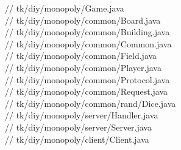\documentclass[12pt,titlepage,oneside]{article}
\newcommand{\includesrc}[1]{{// #1}\\}
\begin{document}
        \includesrc{tk/diy/monopoly/Game.java}
        \includesrc{tk/diy/monopoly/common/Board.java}
        \includesrc{tk/diy/monopoly/common/Building.java}
        \includesrc{tk/diy/monopoly/common/Common.java}
        \includesrc{tk/diy/monopoly/common/Field.java}
        \includesrc{tk/diy/monopoly/common/Player.java}
        \includesrc{tk/diy/monopoly/common/Protocol.java}
        \includesrc{tk/diy/monopoly/common/Request.java}
        \includesrc{tk/diy/monopoly/common/rand/Dice.java}
        \includesrc{tk/diy/monopoly/server/Handler.java}
        \includesrc{tk/diy/monopoly/server/Server.java}
        \includesrc{tk/diy/monopoly/client/Client.java}
\end{document}
